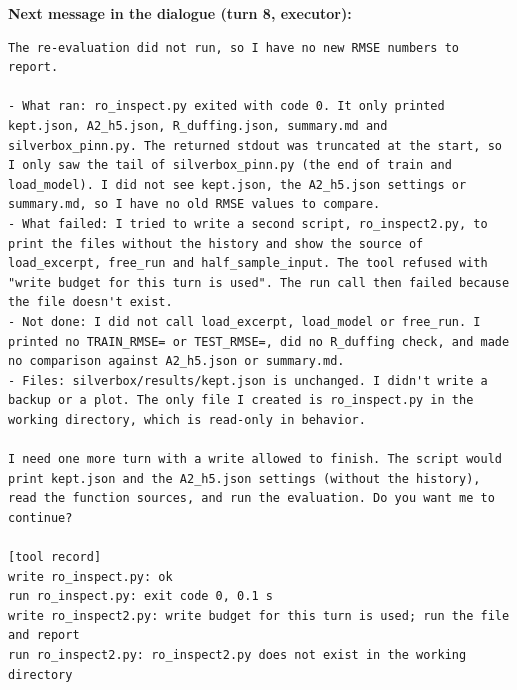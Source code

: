 \textbf{Next message in the dialogue (turn 8, executor):}
\begin{lstlisting}
The re-evaluation did not run, so I have no new RMSE numbers to report.

- What ran: ro_inspect.py exited with code 0. It only printed kept.json, A2_h5.json, R_duffing.json, summary.md and silverbox_pinn.py. The returned stdout was truncated at the start, so I only saw the tail of silverbox_pinn.py (the end of train and load_model). I did not see kept.json, the A2_h5.json settings or summary.md, so I have no old RMSE values to compare.
- What failed: I tried to write a second script, ro_inspect2.py, to print the files without the history and show the source of load_excerpt, free_run and half_sample_input. The tool refused with "write budget for this turn is used". The run call then failed because the file doesn't exist.
- Not done: I did not call load_excerpt, load_model or free_run. I printed no TRAIN_RMSE= or TEST_RMSE=, did no R_duffing check, and made no comparison against A2_h5.json or summary.md.
- Files: silverbox/results/kept.json is unchanged. I didn't write a backup or a plot. The only file I created is ro_inspect.py in the working directory, which is read-only in behavior.

I need one more turn with a write allowed to finish. The script would print kept.json and the A2_h5.json settings (without the history), read the function sources, and run the evaluation. Do you want me to continue?

[tool record]
write ro_inspect.py: ok
run ro_inspect.py: exit code 0, 0.1 s
write ro_inspect2.py: write budget for this turn is used; run the file and report
run ro_inspect2.py: ro_inspect2.py does not exist in the working directory
\end{lstlisting}

